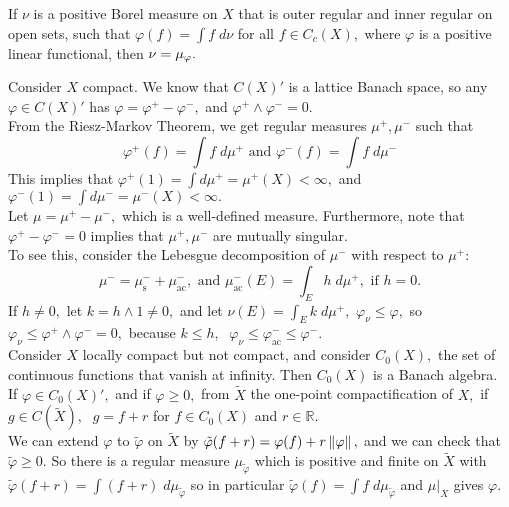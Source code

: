 \begin{thm}
If $\nu$ is a positive Borel measure on $X$ that is outer regular and inner regular on open sets, such that $\varphi(f)=\int f\;d\nu$ for all $f\in C_c(X),$ where $\varphi$ is a positive linear functional, then $\nu=\mu_{\varphi}.$ \\
\end{thm}

\noindent Consider $X$ compact. We know that $C(X)'$ is a lattice Banach space, so any $\varphi\in C(X)'$ has $\varphi=\varphi^+-\varphi^-,$ and $\varphi^+\land\varphi^-=0.$ \\
From the Riesz-Markov Theorem, we get regular measures $\mu^+,\mu^-$ such that
$$\varphi^+(f)=\int f\;d\mu^+ \text{ and } \varphi^-(f)=\int f\;d\mu^-$$
This implies that $\varphi^+(1)=\displaystyle\int d\mu^+=\mu^+(X)<\infty,$ and $\varphi^-(1)=\displaystyle\int d\mu^-=\mu^-(X)<\infty.$ \\
Let $\mu=\mu^+-\mu^-,$ which is a well-defined measure. Furthermore, note that $\varphi^+-\varphi^-=0$ implies that $\mu^+,\mu^-$ are mutually singular. \\

To see this, consider the Lebesgue decomposition of $\mu^-$ with respect to $\mu^+$:
$$\mu^-=\mu_{\text{s}}^-+\mu_{\text{ac}}^-, \text{ and } \mu_{\text{ac}}^-(E)=\int_E h\;d\mu^+, \text{ if } h=0.$$
If $h\neq 0,$ let $k=h\land 1\neq 0,$ and let $\nu(E)=\int_E k\;d\mu^+,$ $\varphi_{\nu}\leq\varphi,$ so $\varphi_{\nu}\leq\varphi^+\land\varphi^-=0,$ because $k\leq h,\;$ $\varphi_{\nu}\leq\varphi_{\text{ac}}^-\leq\varphi^-.$ \\


\noindent Consider $X$ locally compact but not compact, and consider $C_0(X),$ the set of continuous functions that vanish at infinity. Then $C_0(X)$ is a Banach algebra. \\
If $\varphi\in C_0(X)',$ and if $\varphi\geq 0,$ from $\tilde{X}$ the one-point compactification of $X,$ if $g\in C(\tilde{X}),\;$ $g=f+r$ for $f\in C_0(X)$ and $r\in\mathbb{R}.$ \\
We can extend $\varphi$ to $\tilde{\varphi}$ on $\tilde{X}$ by $\tilde{\varphi}(f+r)=\varphi(f)+r\left\lVert\varphi\right\rVert,$ and we can check that $\tilde{\varphi}\geq 0.$ So there is a regular measure $\mu_{\tilde{\varphi}}$ which is positive and finite on $\tilde{X}$ with $\tilde{\varphi}(f+r)=\displaystyle\int (f+r)\;d\mu_{\tilde{\varphi}}$ so in particular $\tilde{\varphi}(f)=\displaystyle\int f\;d\mu_{\tilde{\varphi}}$ and $\mu\Big|_X$ gives $\varphi.$
